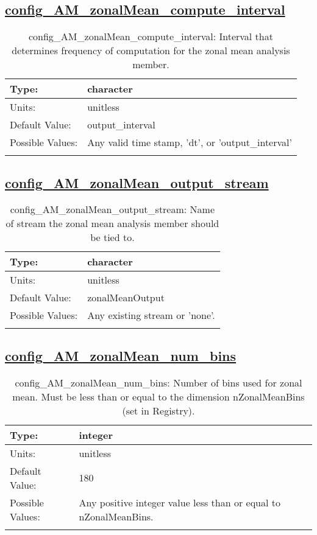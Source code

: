 \subsection[config\_AM\_zonalMean\_compute\_interval]{\hyperref[sec:nm_tab_AM_zonalMean]{config\_AM\_zonalMean\_compute\_interval}}
\label{subsec:nm_sec_config_AM_zonalMean_compute_interval}
\begin{center}
\begin{longtable}{| p{2.0in} || p{4.0in} |}
    \hline
    Type: & character \\
    \hline
    Units: & \si{unitless} \\
    \hline
    Default Value: & output\_interval \\
    \hline
    Possible Values: & Any valid time stamp, 'dt', or 'output\_interval' \\
    \hline
    \caption{config\_AM\_zonalMean\_compute\_interval: Interval that determines frequency of computation for the zonal mean analysis member.}
\end{longtable}
\end{center}
\subsection[config\_AM\_zonalMean\_output\_stream]{\hyperref[sec:nm_tab_AM_zonalMean]{config\_AM\_zonalMean\_output\_stream}}
\label{subsec:nm_sec_config_AM_zonalMean_output_stream}
\begin{center}
\begin{longtable}{| p{2.0in} || p{4.0in} |}
    \hline
    Type: & character \\
    \hline
    Units: & \si{unitless} \\
    \hline
    Default Value: & zonalMeanOutput \\
    \hline
    Possible Values: & Any existing stream or 'none'. \\
    \hline
    \caption{config\_AM\_zonalMean\_output\_stream: Name of stream the zonal mean analysis member should be tied to.}
\end{longtable}
\end{center}
\subsection[config\_AM\_zonalMean\_num\_bins]{\hyperref[sec:nm_tab_AM_zonalMean]{config\_AM\_zonalMean\_num\_bins}}
\label{subsec:nm_sec_config_AM_zonalMean_num_bins}
\begin{center}
\begin{longtable}{| p{2.0in} || p{4.0in} |}
    \hline
    Type: & integer \\
    \hline
    Units: & \si{unitless} \\
    \hline
    Default Value: & 180 \\
    \hline
    Possible Values: & Any positive integer value less than or equal to nZonalMeanBins. \\
    \hline
    \caption{config\_AM\_zonalMean\_num\_bins: Number of bins used for zonal mean.  Must be less than or equal to the dimension nZonalMeanBins (set in Registry).}
\end{longtable}
\end{center}
